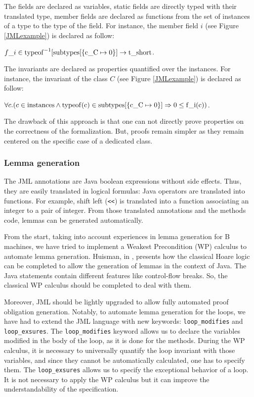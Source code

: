  The fields are declared as variables, static fields are directly typed with their translated type,
 member fields are declared as functions from the set of instances of a type to the type of the field.
 For instance, the member field $i$ (see Figure \ref{JMLexample}) is declared as follow:
 \begin{center}
 $f\_i \in \rm{typeof}^{-1}[\rm{subtypes}[\{c\_C \mapsto 0\}] \rightarrow \rm{t\_short}$.
 \end{center}

 The invariants are declared as properties quantified over the instances.
 For instance, the invariant of the class $C$ (see Figure \ref{JMLexample}) is declared as follow:
\begin{center}
 $\forall c.(c \in \rm{instances} \land \rm{typeof}(c) \in \rm{subtypes}[\{c\_C \mapsto 0\}] \Rightarrow 0 \le
f\_i(c))$.
\end{center}

 The drawback of this approach is that one can not directly prove properties on the correctness
 of the formalization.  But, proofs remain simpler as they remain
 centered on the specific case of a dedicated class.
\subsubsection{Lemma generation}
 The JML annotations are Java boolean expressions without side
 effects.  Thus, they are easily translated in logical formulas: Java operators are
 translated into functions. For example, shift left (\texttt{<<}) is
 translated into a function associating an integer to a pair of
 integer.  From those translated annotations and the methods code,
 lemmas can be generated automatically.

 From the start, taking into account
 experiences in lemma generation for B machines, we have tried to
 implement a Weakest Precondition (WP) calculus to automate lemma
 generation.  Huisman, in \cite{Huisman:PhD}, presents how the
 classical Hoare logic can be completed to allow the generation of
 lemmas in the context of Java.  The Java statements contain different
 features like control-flow breaks.  So, the classical WP calculus
 should be completed to deal with them.

 Moreover, JML should be lightly upgraded to allow fully automated proof obligation generation.
 Notably, to
 automate lemma generation for the loops, we have had to extend
 the JML language with new keywords: \texttt{loop\_modifies} and \texttt{loop\_exsures}.
 The \texttt{loop\_modifies} keyword allows us to declare the variables modified in
the body of the loop, as it is done for the methods. During the WP calculus, it is necessary to universally
quantify the loop invariant with those variables, and since they cannot be automatically calculated, one has to
specify them.
 The \texttt{loop\_exsures} allows us to specify the exceptional behavior of a loop. It is not necessary to apply
the WP calculus but it can improve the understandability of the specification.

